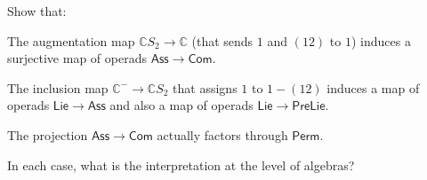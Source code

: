 \begin{question}
Show that:
\begin{tenumerate}
\item The augmentation map
$\mathbb C S_2\longrightarrow \mathbb C$ (that
sends $1$ and $(12)$ to $1$) induces a surjective map of
operads $\mathsf{Ass}
\longrightarrow \mathsf{Com}$.
\item The inclusion map
$\mathbb{C}^- \longrightarrow \mathbb{C}S_2$ that assigns $1$ to 
$1-(12)$ induces a map of operads $\mathsf{Lie}\longrightarrow 
\mathsf{Ass}$ and also a map of operads $\mathsf{Lie}\longrightarrow 
\mathsf{PreLie}$.
\item The projection $\mathsf{Ass}
\longrightarrow \mathsf{Com}$ actually factors
through $\mathsf{Perm}$. 
\end{tenumerate}
In each case, what is the interpretation at the level
of algebras?
\end{question}
